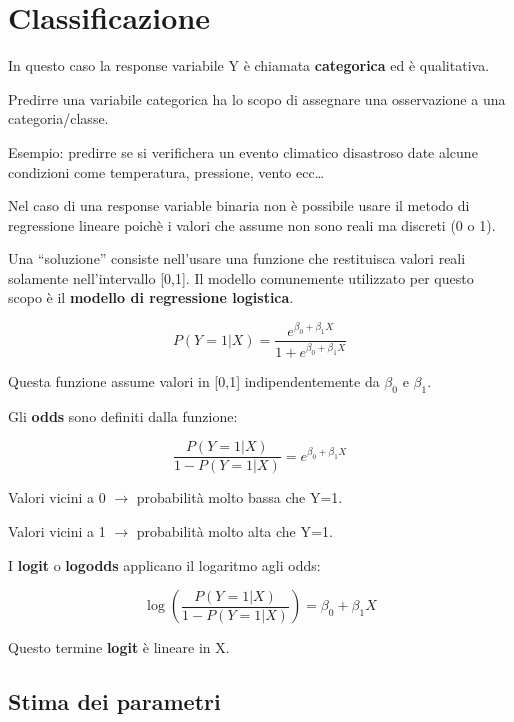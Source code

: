\section{Classificazione}

In questo caso la response variabile Y è chiamata \textbf{categorica} ed è
qualitativa.

Predirre una variabile categorica ha lo scopo di assegnare una osservazione
a una categoria/classe.

Esempio: predirre se si verifichera un evento climatico disastroso date alcune
condizioni come temperatura, pressione, vento ecc\dots

Nel caso di una response variable binaria non è possibile usare il metodo di
regressione lineare poichè i valori che assume non sono reali ma discreti (0 o
1).

Una ``soluzione'' consiste nell'usare una funzione che restituisca valori reali
solamente nell'intervallo [0,1]. Il modello comunemente utilizzato per questo
scopo è il \textbf{modello di regressione logistica}.

\begin{equation} \label{eq:log}
P(Y=1|X) = \frac{e^{\beta_0+\beta_1 X}}{1 + e^{\beta_0+\beta_1 X}}
\end{equation}

Questa funzione assume valori in [0,1] indipendentemente da $\beta_0$ e
$\beta_1$.

Gli \textbf{odds} sono definiti dalla funzione:

\begin{equation}
\frac{P(Y=1|X)}{1-P(Y=1|X)} = e^{\beta_0+\beta_1 X}
\end{equation}

Valori vicini a 0 $\rightarrow$ probabilità molto bassa che Y=1.

Valori vicini a 1 $\rightarrow$ probabilità molto alta che Y=1.

I \textbf{logit} o \textbf{logodds} applicano il logaritmo agli odds:

\begin{equation}
\log \left( \frac{P(Y=1|X)}{1-P(Y=1|X)} \right) = \beta_0+\beta_1 X
\end{equation}

Questo termine \textbf{logit} è lineare in X.

\subsection{Stima dei parametri}

